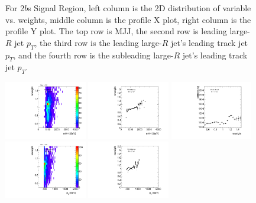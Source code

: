 \begin{figure}[htbp!]
\begin{center}
\caption{For 2$b$s Signal Region, left column is the 2D distribution of variable vs. weights, middle column is the profile X plot, right column is the profile Y plot. The top row is MJJ, the second row is leading large-$R$ jet $p_{T}$, the third row is the leading large-$R$ jet's leading track jet $p_{T}$, and the fourth row is the subleading large-$R$ jet's leading track jet $p_{T}$.}
\label{fig:app-reweight-dist-2b-SR}
\end{center}
\end{figure}


\begin{figure}[htbp!]
\begin{center}
\includegraphics[width=0.32\textwidth,angle=-90]{figures/boosted/AppendixReweight/Weights/3Trk_Signal_mHH_l_weight.pdf}
\includegraphics[width=0.32\textwidth,angle=-90]{figures/boosted/AppendixReweight/Weights/3Trk_Signal_mHH_l_weight_profx.pdf}
\includegraphics[width=0.32\textwidth,angle=-90]{figures/boosted/AppendixReweight/Weights/3Trk_Signal_mHH_l_weight_profy.pdf}\\
\includegraphics[width=0.32\textwidth,angle=-90]{figures/boosted/AppendixReweight/Weights/3Trk_Signal_leadHCand_Pt_m_weight.pdf}
\includegraphics[width=0.32\textwidth,angle=-90]{figures/boosted/AppendixReweight/Weights/3Trk_Signal_leadHCand_Pt_m_weight_profx.pdf}

\end{center}
\end{figure}
